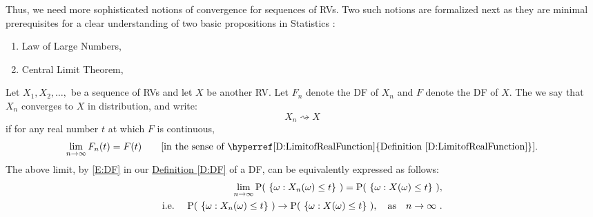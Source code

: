 Thus, we need more sophisticated notions of convergence for sequences of RVs.  Two such notions are formalized next as they are minimal prerequisites for a clear understanding of two basic propositions in Statistics :
\begin{enumerate} 
\item Law of Large Numbers,
\item Central Limit Theorem,
\end{enumerate}

\begin{definition}\label{D:ConvInDist}
Let $X_1,X_2,\ldots,$ be a sequence of RVs and let $X$ be another RV.  Let $F_n$ denote the DF of $X_n$ and $F$ denote the DF of $X$.  The we say that $X_n$ converges to $X$ in distribution, and write:
\[
X_n \rightsquigarrow X
\]
if for any real number $t$ at which $F$ is continuous,
\[
\lim_{n \rightarrow \infty} F_n(t) = F(t) \qquad \text{[in the sense of \hyperref[D:LimitofRealFunction]{Definition \ref*{D:LimitofRealFunction}}].}
\]
The above limit, by \eqref{E:DF} in our \hyperref[D:DF]{Definition \ref*{D:DF}} of a DF, can be equivalently expressed as follows: 
\begin{eqnarray}
& & \lim_{n \rightarrow \infty} \P( \ \{\omega: X_n(\omega) \leq  t \} \ )= 
\P( \ \{\omega: X(\omega) \leq  t \} \ ), \notag \\
&\text{i.e.~} & \P( \ \{\omega: X_n(\omega) \leq t \} \ ) \rightarrow \P( \ \{\omega: X(\omega) \leq  t \} \ ), \quad \text{as} \quad n \rightarrow \infty \notag \ .
\end{eqnarray}
\end{definition}

